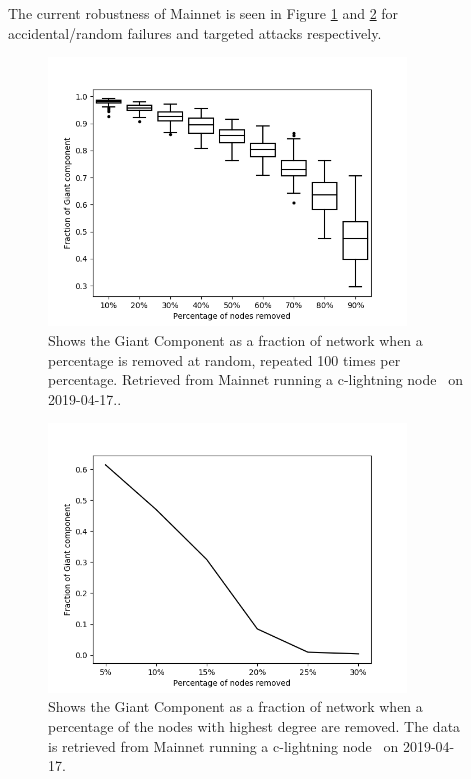 The current robustness of Mainnet is seen in Figure \ref{fig:accidental_failure} and \ref{fig:coordinated_attack} for accidental/random failures and targeted attacks respectively.

\vspace*{-0.38cm}
\begin{figure}[!htb]
	\hspace*{-0.5cm} 
	\centering
	\includegraphics[width=9.5cm]{images/robustness_accidental.png}
	\caption{Shows the Giant Component as a fraction of network when a percentage is removed at random, repeated 100 times per percentage. Retrieved from Mainnet running a c-lightning node~\cite{repository:clightning} on 2019-04-17..
	}
	\label{fig:accidental_failure}
	\hspace*{2mm} 
\end{figure}

\begin{figure}[!htb]
	\hspace*{-1cm} 
	\centering
	\includegraphics[width=9.5cm]{images/robustness_coordinated_mait.png}
	\caption{Shows the Giant Component as a fraction of network when a percentage of the nodes with highest degree are removed. The data is retrieved from Mainnet running a c-lightning node~\cite{repository:clightning} on 2019-04-17.
	}
	\label{fig:coordinated_attack}
	\hspace*{2mm}
\end{figure}

